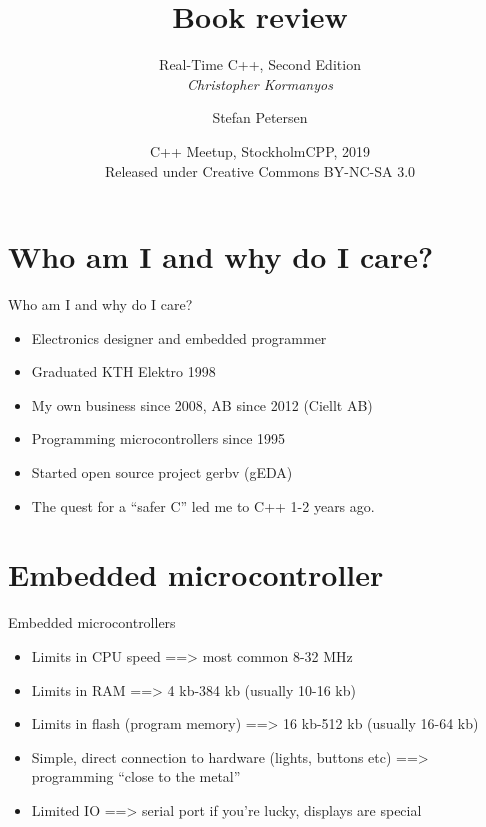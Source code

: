 \documentclass{beamer}
\title{Book review }
\subtitle{Real-Time C++, Second Edition \\ \emph{Christopher Kormanyos}}
\author{Stefan Petersen}
\date[2019-02-21]{C++ Meetup, StockholmCPP, 2019 \\
  Released under Creative Commons BY-NC-SA 3.0 \\
  \cc \byncsa}
\begin{document}
\begin{frame}
  \titlepage
\end{frame}
\section{Who am I and why do I care?}
\begin{frame}{Who am I and why do I care?}
  \begin{itemize}
  \item Electronics designer and embedded programmer
  \item Graduated KTH Elektro 1998
  \item My own business since 2008, AB since 2012 (Ciellt AB)
  \item Programming microcontrollers since 1995
  \item Started open source project gerbv (gEDA)
  \item The quest for a ``safer C'' led me to C++ 1-2 years ago.
  \end{itemize}
\end{frame}

\section{Embedded microcontroller}

\begin{frame}{Embedded microcontrollers}
  \begin{itemize}
  \item  Limits in CPU speed
    \pause ==> most common 8-32 MHz
    \pause \item Limits in RAM
    \pause ==> 4 kb-384 kb (usually 10-16 kb)
    \pause \item Limits in flash (program memory)
    \pause ==> 16 kb-512 kb (usually 16-64 kb)
    \pause \item Simple, direct connection to hardware (lights, buttons etc)
    \pause ==> programming ``close to the metal''
    \pause \item Limited IO
    \pause ==> serial port if you're lucky, displays are special
  \end{itemize}
\end{frame}
\end{document}
